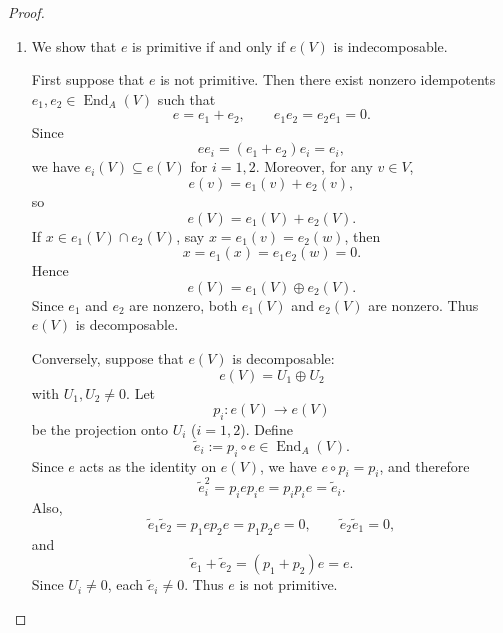 \begin{proof}
\begin{enumerate}
              These two constructions are inverse to each other, so direct sum decompositions
              \[
                  V=W_1\oplus W_2
              \]
              are in bijection with idempotent decompositions
              \[
                  1=e+f
              \]
              in \(\operatorname{End}_A(V)\).

        \item We show that \(e\) is primitive if and only if \(e(V)\) is indecomposable.

              First suppose that \(e\) is not primitive. Then there exist nonzero idempotents
              \(e_1,e_2\in \operatorname{End}_A(V)\) such that
              \[
                  e=e_1+e_2,
                  \qquad
                  e_1e_2=e_2e_1=0.
              \]
              Since
              \[
                  ee_i=(e_1+e_2)e_i=e_i,
              \]
              we have \(e_i(V)\subseteq e(V)\) for \(i=1,2\). Moreover, for any \(v\in V\),
              \[
                  e(v)=e_1(v)+e_2(v),
              \]
              so
              \[
                  e(V)=e_1(V)+e_2(V).
              \]
              If \(x\in e_1(V)\cap e_2(V)\), say \(x=e_1(v)=e_2(w)\), then
              \[
                  x=e_1(x)=e_1e_2(w)=0.
              \]
              Hence
              \[
                  e(V)=e_1(V)\oplus e_2(V).
              \]
              Since \(e_1\) and \(e_2\) are nonzero, both \(e_1(V)\) and \(e_2(V)\) are nonzero.
              Thus \(e(V)\) is decomposable.

              Conversely, suppose that \(e(V)\) is decomposable:
              \[
                  e(V)=U_1\oplus U_2
              \]
              with \(U_1,U_2\neq 0\). Let
              \[
                  p_i\colon e(V)\to e(V)
              \]
              be the projection onto \(U_i\) (\(i=1,2\)). Define
              \[
                  \widetilde e_i:=p_i\circ e \in \operatorname{End}_A(V).
              \]
              Since \(e\) acts as the identity on \(e(V)\), we have \(e\circ p_i=p_i\), and therefore
              \[
                  \widetilde e_i^2=p_i e p_i e=p_i p_i e=\widetilde e_i.
              \]
              Also,
              \[
                  \widetilde e_1\widetilde e_2=p_1 e p_2 e=p_1p_2 e=0,
                  \qquad
                  \widetilde e_2\widetilde e_1=0,
              \]
              and
              \[
                  \widetilde e_1+\widetilde e_2=(p_1+p_2)e=e.
              \]
              Since \(U_i\neq 0\), each \(\widetilde e_i\neq 0\). Thus \(e\) is not primitive.


\end{enumerate}
\end{proof}
